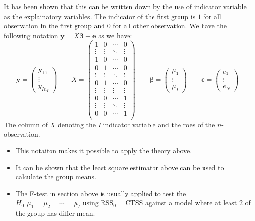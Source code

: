 \begin{remark}
    It has been shown that this can be written down by the use of indicator variable as the explainatory variables. The indicator of the first group is $1$ for all observation in the first group and $0$ for all other observation. We have the following notation $\boldsymbol y = X\boldsymbol \beta + \boldsymbol e$ as we have:
    \begin{equation*}
        \boldsymbol y = \begin{pmatrix}
            \boldsymbol y_{11} \\ \vdots \\ y_{In_I}
        \end{pmatrix} \qquad X = \begin{pmatrix}
            1 & 0 & \cdots & 0 \\
            \vdots & \vdots & \ddots & \vdots \\
            1 & 0 & \cdots & 0 \\
            0 & 1 & \cdots & 0 \\
            \vdots & \vdots & \ddots & \vdots \\
            0 & 1 & \cdots & 0 \\
            \vdots & \vdots & \vdots & \vdots \\
            0 & 0 & \cdots & 1 \\
            \vdots & \vdots & \ddots & \vdots \\
            0 & 0 & \cdots & 1 \\
        \end{pmatrix} \qquad \boldsymbol \beta = \begin{pmatrix}
            \mu_1 \\ \vdots \\ \mu_I
        \end{pmatrix} \qquad \boldsymbol e = \begin{pmatrix}
            e_1 \\ \vdots \\ e_N
        \end{pmatrix}
    \end{equation*}
    The column of $X$ denoting the $I$ indicator variable and the roes of the $n$-observation.
    \begin{itemize}
        \item This notaiton makes it possible to apply the theory above. 
        \item It can be shown that the least square estimator above can be used to calculate the group means. 
        \item The F-test in section above is usually applied to test the $H_0 : \mu_1=\mu_2=\cdots=\mu_I$ using $\text{RSS}_0 = \text{CTSS}$ against a model where at least $2$ of the group has differ mean.
    \end{itemize}
\end{remark}

